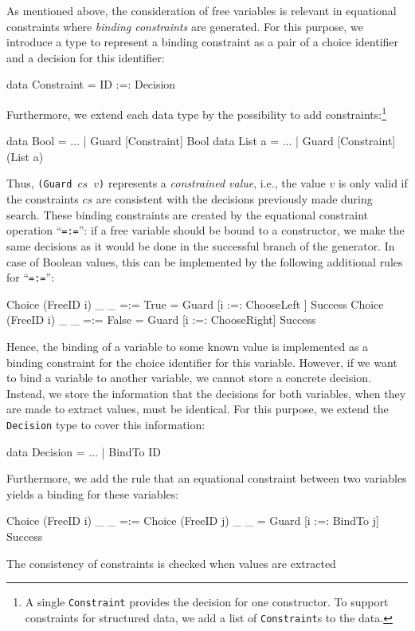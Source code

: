 \documentclass{llncs}
\newcommand{\code}[1]{\mbox{\small\texttt{#1}}}
\newcommand{\ccode}[1]{``\code{#1}''}
\begin{document}
As mentioned above, the consideration of free variables
is relevant in equational constraints where \emph{binding constraints} are
generated. For this purpose, we introduce a type to represent
a binding constraint as a pair of a choice identifier
and a decision for this identifier:
\begin{haskell}
  data Constraint = ID :=: Decision
\end{haskell}
Furthermore, we extend each data type by the possibility to
add constraints:\footnote{A single \code{Constraint} provides the decision for
one constructor. To support constraints for structured data,
we add a list of \code{Constraint}s to the data.}
\begin{haskell}
  data Bool   = $\ldots$ | Guard [Constraint] Bool
  data List a = $\ldots$ | Guard [Constraint] (List a)
\end{haskell}
Thus, \code{(Guard $cs$ $v$)} represents a \emph{constrained value},
i.e., the value $v$ is only valid if the constraints $cs$ are
consistent with the decisions previously made during search.
These binding constraints are created by the
equational constraint operation \ccode{=:=}: if a free variable
should be bound to a constructor, we make the same
decisions as it would be done in the successful branch
of the generator. In case of Boolean values,
this can be implemented by the following additional rules
for \ccode{=:=}:
\begin{haskell}
  Choice (FreeID i) _ _ =:= True   =  Guard [i :=: ChooseLeft ] Success
  Choice (FreeID i) _ _ =:= False  =  Guard [i :=: ChooseRight] Success
\end{haskell}
Hence, the binding of a variable to some known value
is implemented as a binding constraint for the choice identifier
for this variable. However, if we want to bind a variable
to another variable, we cannot store a concrete decision.
Instead, we store the information that the decisions for
both variables, when they are made to extract values,
must be identical. For this purpose, we extend the \code{Decision}
type to cover this information:
\begin{haskell}
  data Decision = $\ldots$ | BindTo ID
\end{haskell}
Furthermore, we add the rule that an equational constraint
between two variables yields a binding for these variables:
\begin{haskell}
  Choice (FreeID i) _ _ =:= Choice (FreeID j) _ _
    =  Guard [i :=: BindTo j] Success
\end{haskell}
%
The consistency of constraints is checked when values are extracted
\end{document}
